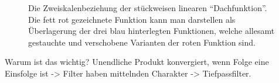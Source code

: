 \begin{figure}[ht]
\centering
{}
\caption{Die Zweiskalenbeziehung der stückweisen linearen \enquote{Dachfunktion}. Die fett rot
gezeichnete Funktion kann man darstellen als Überlagerung der drei blau hinterlegten Funktionen,
welche allesamt gestauchte und verschobene Varianten der roten Funktion sind.}
\label{fig:zweiskalenbeziehung}
\end{figure}

\begin{remark}[Zweiskalenbeziehung]
Warum ist das wichtig?
Unendliche Produkt konvergiert, wenn Folge eine Einsfolge ist -> Filter haben mittelnden Charakter 
-> Tiefpassfilter.
\end{remark}